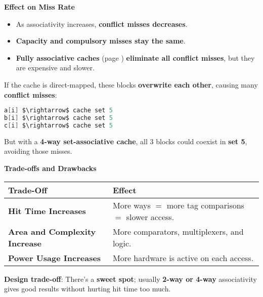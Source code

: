 \highspace
\begin{flushleft}
    \textcolor{Green3}{ \textbf{Effect on Miss Rate}}
\end{flushleft}
\begin{itemize}
    \item As associativity increases, \textbf{conflict misses decreases}.
    \item \textbf{Capacity and compulsory misses stay the same}.
    \item \textbf{Fully associative caches} (page \pageref{def: Fully Associative Cache}) \textbf{eliminate all conflict misses}, but they are expensive and slower.
\end{itemize}

\begin{examplebox}
    If the cache is direct-mapped, these blocks \textbf{overwrite each other}, causing many \textbf{conflict misses}:
    \begin{lstlisting}[language=c, mathescape=true]
a[i] $\rightarrow$ cache set 5
b[i] $\rightarrow$ cache set 5
c[i] $\rightarrow$ cache set 5\end{lstlisting}
    But with a \textbf{4-way set-associative cache}, all 3 blocks could coexist in \textbf{set 5}, avoiding those misses.
\end{examplebox}

\highspace
\begin{flushleft}
    \textcolor{Red2}{ \textbf{Trade-offs and Drawbacks}}
\end{flushleft}
\begin{table}[!htp]
    \centering
    \begin{tabular}{@{} l p{17em} @{}}
        \toprule
        Trade-Off & Effect \\
        \midrule
        \textbf{Hit Time Increases}             & More ways $=$ more tag comparisons $=$ slower access. \\ [.3em]
        \textbf{Area and Complexity Increase}   & More comparators, multiplexers, and logic. \\ [.3em]
        \textbf{Power Usage Increases}          & More hardware is active on each access. \\
        \bottomrule
    \end{tabular}
\end{table}

\noindent
\textbf{Design trade-off}: There's a \textbf{sweet spot}; usually \textbf{2-way or 4-way} associativity gives good results without hurting hit time too much.

